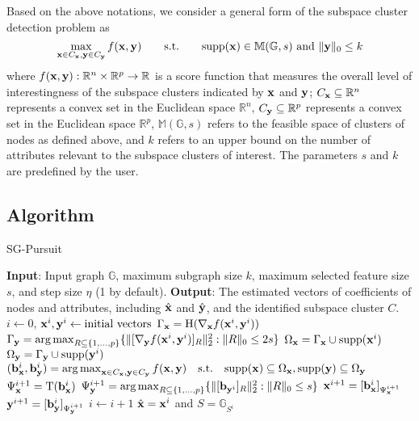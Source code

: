 \documentclass{article}
\let\oldReturn\Return
\renewcommand{\Return}{\State\oldReturn}
\DeclareMathOperator*{\argmax}{arg\,max}
\begin{document}
Based on the above notations, we consider a general form of the subspace cluster detection problem as
\begin{equation*}
\max_{{\bf x}\in C_{\bf x},{\bf y}\in C_{\bf y}} f({\bf x}, {\bf y})\qquad \mathrm{s.t.}\qquad \mathrm{supp}({\bf x})\in\mathbb{M}(\mathbb{G}, s) \text{ and }\|{\bf y}\|_0\leq k
\end{equation*}
where $f({\bf x}, {\bf y}):\mathbb{R}^n\times\mathbb{R}^p\to\mathbb{R}$ is a score function that measures the overall level of interestingness of the subspace clusters indicated by ${\bf x}$ and ${\bf y}$; $C_{\bf x}\subseteq\mathbb{R}^n$ represents a convex set in the Euclidean space $\mathbb{R}^n$, $C_{\bf y}\subseteq\mathbb{R}^p$ represents a convex set in the Euclidean space $\mathbb{R}^p$, $\mathbb{M}(\mathbb{G}, s)$ refers to the feasible space of clusters of nodes as defined above, and $k$ refers to an upper bound on the number of attributes relevant to the subspace clusters of interest. The parameters $s$ and $k$ are predefined by the user.

\subsection{Algorithm}

\begin{algorithm}
\caption{SG-Pursuit}\label{alg:sgpursuit}
\begin{algorithmic}[1]
\State \textbf{Input}: Input graph $\mathbb{G}$, maximum subgraph size $k$, maximum selected feature size $s$, and step size $\eta$ (1 by default).
\State \textbf{Output}: The estimated vectors of coefficients of nodes and attributes, including $\hat{{\bf x}}$ and $\hat{{\bf y}}$, and the identified subspace cluster $C$.
\State $i\gets 0$, ${\bf x}^i, {\bf y}^i\gets \text{initial vectors}$
\Repeat
\State $\Gamma_{{\bf x}}=\mathrm{H}(\nabla_{\bf x}f({\bf x}^i, {\bf y}^i))$
\State $\Gamma_{{\bf y}}=\argmax_{R\subseteq\{1,\dots,p \}}\{\|[\nabla_{{\bf y}}f({\bf x}^i, {\bf y}^i)]_{R}\|_2^2:\|R\|_0\leq 2s\}$
\State $\Omega_{{\bf x}}=\Gamma_{{\bf x}}\cup\mathrm{supp}({\bf x}^i)$
\State $\Omega_{{\bf y}}=\Gamma_{{\bf y}}\cup\mathrm{supp}({\bf y}^i)$
\State $({\bf b}_{{\bf x}}^i, {\bf b}_{{\bf y}}^i)=\argmax_{{\bf x}\in C_{{\bf x}},{\bf y}\in C_{{\bf y}}}f({\bf x}, {\bf y})\quad\mathrm{s.t.}\quad\mathrm{supp}({\bf x})\subseteq\Omega_{{\bf x}},\mathrm{supp}({\bf y})\subseteq\Omega_{{\bf y}}$
\State $\Psi_{{\bf x}}^{i+1}=\mathrm{T}({\bf b}_{{\bf x}}^i)$
\State $\Psi_{{\bf y}}^{i+1}=\argmax_{R\subseteq\{1,\dots,p\}}\{\|[{\bf b}_{{\bf y}^i}]_{R}\|_2^2:\|R\|_0\leq s \}$
\State ${\bf x}^{i+1}=[{\bf b}_{{\bf x}}^i]_{\Psi_{{\bf x}}^{i+1}}$
\State ${\bf y}^{i+1}=[{\bf b}_{{\bf y}}^i]_{\Psi_{{\bf y}}^{i+1}}$
\State $i\gets i+1$
\Return $\hat{{\bf x}}={\bf x}^i$ and $S=\mathbb{G}_{S^i}$
\end{algorithmic}
\end{algorithm}
\end{document}
